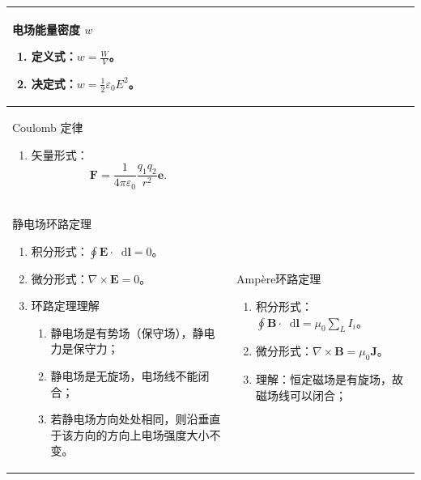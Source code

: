 \documentclass[UTF8,fontset=fandol,zihao=5]{ctexart}
\newcommand{\vect}[1]{\bm{#1}}
\newcommand{\dif}{\mathop{}\!\mathrm{d}}
\begin{document}
\begin{longtable}{|>{\raggedright\arraybackslash}p{}|>{\raggedright\arraybackslash}p{}|}
\centering 电场能量密度 \(w\)
\begin{enumerate}
  \item 定义式：\(\displaystyle w=\frac{W}{V}\)。
  \item 决定式：\(\displaystyle w=\frac12\varepsilon_0E^2\)。
\end{enumerate}
& \\ \hline

\centering Coulomb 定律
\begin{enumerate}
  \item 矢量形式：
  \[
    \vect F=\frac{1}{4\pi\varepsilon_0}\frac{q_1q_2}{r^2}\vect e.
  \]
\end{enumerate}
\vspace{0.45em}
& \\ \hline

\centering 静电场环路定理
\begin{enumerate}
  \item 积分形式：\(\displaystyle\oint\vect E\cdot\dif\vect l=0\)。
  \item 微分形式：\(\nabla\times\vect E=0\)。
  \item 环路定理理解
  \begin{enumerate}
    \item 静电场是有势场（保守场），静电力是保守力；
    \item 静电场是无旋场，电场线不能闭合；
    \item 若静电场方向处处相同，则沿垂直于该方向的方向上电场强度大小不变。
  \end{enumerate}
\end{enumerate}
& \centering\arraybackslash Ampère环路定理
\begin{enumerate}
  \item 积分形式：\(\displaystyle\oint\vect B\cdot\dif\vect l=\mu_0 \sum_L I_{i}\)。
  \item 微分形式：\(\nabla\times\vect B=\mu_0\vect J\)。
  \item 理解：恒定磁场是有旋场，故磁场线可以闭合；
\end{enumerate}
\\ \hline


\end{longtable}
\end{document}
